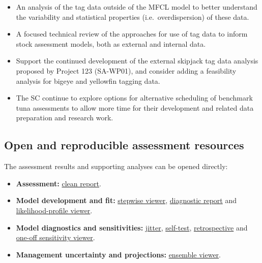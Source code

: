 \documentclass[
  english,
  a4paper,
  a4paper,
  11pt]{SCreport}
\begin{document}
\begin{itemize}
\item
  An analysis of the tag data outside of the MFCL model to better
  understand the variability and statistical properties
  (i.e.~overdispersion) of these data.
\item
  A focused technical review of the approaches for use of tag data to
  inform stock assessment models, both as external and internal data.
\item
  Support the continued development of the external skipjack tag data
  analysis proposed by Project 123 (SA-WP01), and consider adding a
  feasibility analysis for bigeye and yellowfin tagging data.
\item
  The SC continue to explore options for alternative scheduling of
  benchmark tuna assessments to allow more time for their development
  and related data preparation and research work.
\end{itemize}

\subsection{Open and reproducible assessment
resources}\label{open-and-reproducible-assessment-resources}

The assessment results and supporting analyses can be opened directly:

\begin{itemize}
\item
  \textbf{Assessment:}
  \href{https://pacificcommunity.github.io/ofp-sam-bet-2026-report/}{clean
  report}.
\item
  \textbf{Model development and fit:}
  \href{https://pacificcommunity.github.io/ofp-sam-bet-2026-stepwise/interactive-model-viewer.html}{stepwise
  viewer},
  \href{https://pacificcommunity.github.io/ofp-sam-bet-2026-diagnostic/bet-2026-diagnostic-report.html}{diagnostic
  report} and
  \href{https://pacificcommunity.github.io/ofp-sam-bet-2026-diagnostic/bet-2026-likelihood-profile-viewer.html}{likelihood-profile
  viewer}.
\item
  \textbf{Model diagnostics and sensitivities:}
  \href{https://pacificcommunity.github.io/ofp-sam-bet-2026-jitter/jitter-report.html}{jitter},
  \href{https://pacificcommunity.github.io/ofp-sam-bet-2026-selftest/selftest-report.html}{self-test},
  \href{https://pacificcommunity.github.io/ofp-sam-bet-2026-retrospective/retrospective-report.html}{retrospective}
  and
  \href{https://pacificcommunity.github.io/ofp-sam-bet-2026-sensitivity/bet-2026-sensitivity-interactive-viewer.html}{one-off
  sensitivity viewer}.
\item
  \textbf{Management uncertainty and projections:}
  \href{https://pacificcommunity.github.io/ofp-sam-bet-2026-ensemble/bet-2026-ensemble-interactive-viewer.html}{ensemble
  viewer}.
\end{itemize}
\end{document}
